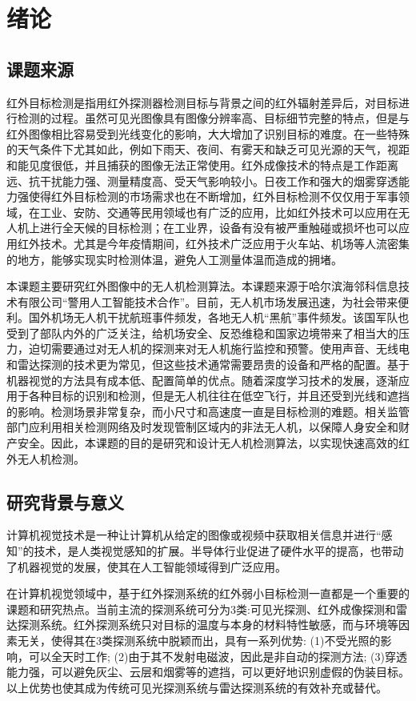 \chapter{绪论}

\section{课题来源}
红外目标检测是指用红外探测器检测目标与背景之间的红外辐射差异后，对目标进行检测的过程。虽然可见光图像具有图像分辨率高、目标细节完整的特点，但是与红外图像相比容易受到光线变化的影响，大大增加了识别目标的难度。在一些特殊的天气条件下尤其如此，例如下雨天、夜间、有雾天和缺乏可见光源的天气，视距和能见度很低，并且捕获的图像无法正常使用。红外成像技术的特点是工作距离远、抗干扰能力强、测量精度高、受天气影响较小。日夜工作和强大的烟雾穿透能力强使得红外目标检测的市场需求也在不断增加，红外目标检测不仅仅用于军事领域，在工业、安防、交通等民用领域也有广泛的应用，比如红外技术可以应用在无人机上进行全天候的目标检测；在工业界，设备有没有被严重触碰或损坏也可以应用红外技术。尤其是今年疫情期间，红外技术广泛应用于火车站、机场等人流密集的地方，能够实现实时检测体温，避免人工测量体温而造成的拥堵。

本课题主要研究红外图像中的无人机检测算法。本课题来源于哈尔滨海邻科信息技术有限公司“警用人工智能技术合作”。目前，无人机市场发展迅速，为社会带来便利。国外机场无人机干扰航班事件频发，各地无人机“黑航”事件频发。该国军队也受到了部队内外的广泛关注，给机场安全、反恐维稳和国家边境带来了相当大的压力，迫切需要通过对无人机的探测来对无人机施行监控和预警。使用声音、无线电和雷达探测的技术更为常见，但这些技术通常需要昂贵的设备和严格的配置。基于机器视觉的方法具有成本低、配置简单的优点。随着深度学习技术的发展，逐渐应用于各种目标的识别和检测，但是无人机往往在低空飞行，并且还受到光线和遮挡的影响。检测场景非常复杂，而小尺寸和高速度一直是目标检测的难题。相关监管部门应利用相关检测网络及时发现管制区域内的非法无人机，以保障人身安全和财产安全。因此，本课题的目的是研究和设计无人机检测算法，以实现快速高效的红外无人机检测。

\section{研究背景与意义}
计算机视觉技术是一种让计算机从给定的图像或视频中获取相关信息并进行“感知”的技术，是人类视觉感知的扩展。半导体行业促进了硬件水平的提高，也带动了机器视觉的发展，使其在人工智能领域得到广泛应用。

在计算机视觉领域中，基于红外探测系统的红外弱小目标检测一直都是一个重要的课题和研究热点。当前主流的探测系统可分为3类:可见光探测、红外成像探测和雷达探测系统。红外探测系统只对目标的温度与本身的材料特性敏感，而与环境等因素无关，使得其在3类探测系统中脱颖而出，具有一系列优势:
(1)不受光照的影响，可以全天时工作;
(2)由于其不发射电磁波，因此是非自动的探测方法;
(3)穿透能力强，可以避免灰尘、云层和烟雾等的遮挡，可以更好地识别虚假的伪装目标。以上优势也使其成为传统可见光探测系统与雷达探测系统的有效补充或替代。

